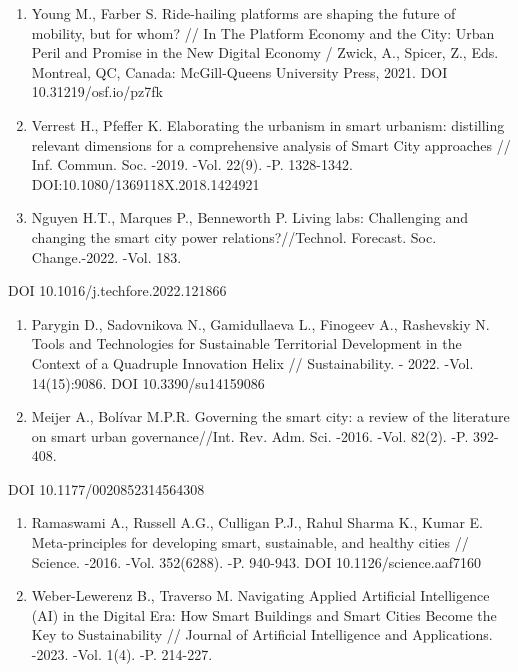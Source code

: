 {\begin{enumerate}
  Noy K., Givoni M. Is 'smart mobility' sustainable? Examining the views
  and beliefs of transport's technological entrepreneurs //
  Sustainability. -2018. -Vol. 10(2):422. DOI 10.3390/su10020422
\item
  Young M., Farber S. Ride-hailing platforms are shaping the future of
  mobility, but for whom? // In The Platform Economy and the City: Urban
  Peril and Promise in the New Digital Economy / Zwick, A., Spicer, Z.,
  Eds. Montreal, QC, Canada: McGill-Queens University Press, 2021. DOI
  10.31219/osf.io/pz7fk
\item
  Verrest H., Pfeffer K. Elaborating the urbanism in smart urbanism:
  distilling relevant dimensions for a comprehensive analysis of Smart
  City approaches // Inf. Commun. Soc. -2019. -Vol. 22(9). -P.
  1328-1342. DOI:10.1080/1369118X.2018.1424921
\item
  Nguyen H.T., Marques P., Benneworth P. Living labs: Challenging and
  changing the smart city power relations?//Technol. Forecast. Soc.
  Change.-2022. -Vol. 183.
\end{enumerate}

DOI 10.1016/j.techfore.2022.121866

\begin{enumerate}
\def\labelenumi{\arabic{enumi}.}
\setcounter{enumi}{12}
\item
  Parygin D., Sadovnikova N., Gamidullaeva L., Finogeev A., Rashevskiy
  N. Tools and Technologies for Sustainable Territorial Development in
  the Context of a Quadruple Innovation Helix // Sustainability. - 2022.
  -Vol. 14(15):9086. DOI 10.3390/su14159086
\item
  Meijer A., Bolívar M.P.R. Governing the smart city: a review of the
  literature on smart urban governance//Int. Rev. Adm. Sci. -2016. -Vol.
  82(2). -P. 392-408.
\end{enumerate}

DOI 10.1177/0020852314564308

\begin{enumerate}
\def\labelenumi{\arabic{enumi}.}
\setcounter{enumi}{14}
\item
  Ramaswami A., Russell A.G., Culligan P.J., Rahul Sharma K., Kumar E.
  Meta-principles for developing smart, sustainable, and healthy cities
  // Science. -2016. -Vol. 352(6288). -P. 940-943. DOI
  10.1126/science.aaf7160
\item
  Weber-Lewerenz B., Traverso M. Navigating Applied Artificial
  Intelligence (AI) in the Digital Era: How Smart Buildings and Smart
  Cities Become the Key to Sustainability // Journal of Artificial
  Intelligence and Applications. -2023. -Vol. 1(4). -P. 214-227.
\end{enumerate}

}
